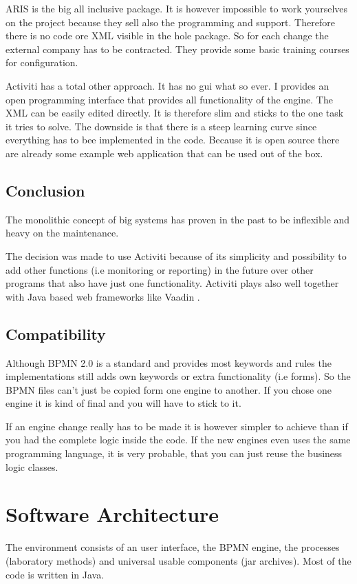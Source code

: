 \documentclass[paper=a4,twoside=false,BCOR=0mm,DIV=calc,fontsize=12pt]{scrartcl}
\begin{document}
ARIS is the big all inclusive package. It is however impossible to work yourselves on the project because they sell also the programming and support. Therefore there is no code ore XML visible in the hole package. So for each change the external company has to be contracted.
They provide some basic training courses for configuration.

Activiti has a total other approach. It has no gui what so ever. I provides an open programming interface that provides all functionality 
of the engine. The XML can be easily edited directly. It is therefore slim and sticks to the one task it tries to solve.
The downside is that there is a steep learning curve since everything has to bee implemented in the code. 
Because it is open source there are already some example web application that can be used out of the box. 

\subsection{Conclusion}
The monolithic concept of big systems has proven in the past to be inflexible and heavy on the maintenance. 

The decision was made to use Activiti because of its simplicity and possibility to add other functions (i.e monitoring or reporting) in the future over other programs that also have just one functionality.
Activiti plays also well together with Java based web frameworks like Vaadin \cite{Vaadin}.


\subsection{Compatibility}
Although BPMN 2.0 is a standard and provides most keywords and rules the implementations still adds own keywords or extra functionality (i.e forms). So the BPMN files can't just be copied form one engine to another. If you chose one engine it is kind of final and you will have to stick to it.

If an engine change really has to be made it is however simpler to achieve than if you had the complete logic inside the code. If the new engines even
uses the same programming language, it is very probable, that you can just reuse the business logic classes. 


\section{Software Architecture}
The environment consists of an user interface, the BPMN engine, the processes (laboratory methods) and universal usable components (jar archives). Most of the code is written in Java. 
\end{document}
